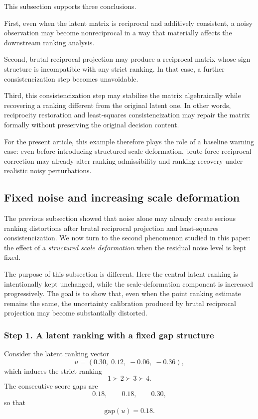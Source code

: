 \documentclass[11pt]{amsart}
\theoremstyle{definition}
\theoremstyle{plain}
\numberwithin{equation}{section}
\begin{document}
This subsection supports three conclusions.

First, even when the latent matrix is reciprocal and additively consistent, a noisy observation may become nonreciprocal in a way that materially affects the downstream ranking analysis.

Second, brutal reciprocal projection may produce a reciprocal matrix whose sign structure is incompatible with any strict ranking. In that case, a further consistencization step becomes unavoidable.

Third, this consistencization step may stabilize the matrix algebraically while recovering a ranking different from the original latent one. In other words, reciprocity restoration and least-squares consistencization may repair the matrix formally without preserving the original decision content.

For the present article, this example therefore plays the role of a baseline warning case: even before introducing structured scale deformation, brute-force reciprocal correction may already alter ranking admissibility and ranking recovery under realistic noisy perturbations.

\subsection{Fixed noise and increasing scale deformation}

The previous subsection showed that noise alone may already create serious ranking distortions after brutal reciprocal projection and least-squares consistencization. We now turn to the second phenomenon studied in this paper: the effect of a \emph{structured scale deformation} when the residual noise level is kept fixed.

The purpose of this subsection is different. Here the central latent ranking is intentionally kept unchanged, while the scale-deformation component is increased progressively. The goal is to show that, even when the point ranking estimate remains the same, the uncertainty calibration produced by brutal reciprocal projection may become substantially distorted.

\subsubsection*{Step 1. A latent ranking with a fixed gap structure}

Consider the latent ranking vector
\[
u=(0.30,\;0.12,\;-0.06,\;-0.36),
\]
which induces the strict ranking
\[
1\succ 2\succ 3\succ 4.
\]
The consecutive score gaps are
\[
0.18,\qquad 0.18,\qquad 0.30,
\]
so that
\[
\mathrm{gap}(u)=0.18.
\]
\end{document}

